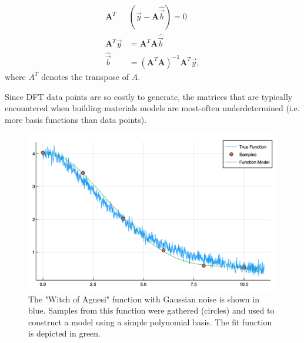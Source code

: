 \begin{align}
\mathbf{A}^T&(\vec{y} - \mathbf{A} \hat{\vec{b}}) = 0 \\
\mathbf{A}^T\vec{y} &= \mathbf{A}^T\mathbf{A}\hat{\vec{b}} \\
\hat{\vec{b}} &= (\mathbf{A}^T\mathbf{A})^{-1}\mathbf{A}^T\vec{y}, \label{eq:bSolve}
\end{align}
where $A^T$ denotes the transpose of $A$.


Since DFT data points are so costly to generate, the matrices that are typically encountered when building materials models are most-often underdetermined (i.e. more basis functions than data points).


\begin{figure}[h]
\includegraphics[scale = 0.4]{Figures/func1True}
\caption{The "Witch of Agnesi" function with Gaussian noise is shown in blue.  Samples from this function were gathered (circles) and used to construct a model using a simple polynomial basis.  The fit function is depicted in green.
\label{fig:func1True}} 
\end{figure}



